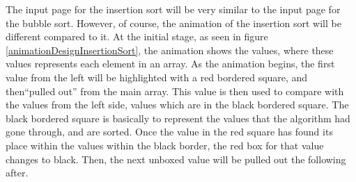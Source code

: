 The input page for the insertion sort will be very similar to the input page for the bubble sort. However, of course, the animation of the insertion sort will be different compared to it. At the initial stage, as seen in figure \ref{animationDesignInsertionSort}, the animation shows the values, where these values represents each element in an array. As the animation begins, the first value from the left will be highlighted with a red bordered square, and then``pulled out'' from the main array. This value is then used to compare with the values from the left side, values which are in the black bordered square. The black bordered square is basically to represent the values that the algorithm had gone through, and are sorted. Once the value in the red square has found its place within the values within the black border, the red box for that value changes to black. Then, the next unboxed value will be pulled out the following after.



\newpage




